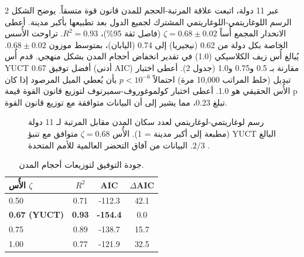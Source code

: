 \documentclass[11pt,a4paper]{article}
\begin{document}
	عبر 11 دولة، اتبعت علاقة المرتبة-الحجم للمدن قانون قوة متسقاً. يوضح الشكل 2 الرسم اللوغاريتمي-اللوغاريتمي المشترك لجميع الدول بعد تطبيعها بأكبر مدينة. أعطى الانحدار المجمع أُساً \(\zeta = 0.68 \pm 0.02\) (فاصل ثقة 95\%)، \(R^2 = 0.93\). تراوحت الأُسس الخاصة بكل دولة من 0.62 (نيجيريا) إلى 0.74 (اليابان)، بمتوسط موزون \(0.68 \pm 0.02\). يُبالغ أُس زيف الكلاسيكي (1.0) في تقدير انخفاض أحجام المدن بشكل منهجي. قدم أُس YUCT 0.67 أفضل توفيق (أدنى AIC) مقارنة بـ 0.5 و0.75 و1.0 (جدول 2). أعطى اختبار تبديل (خلط المراتب 10,000 مرة) احتمالاً \(p < 10^{-6}\) بأن يُعطي الميل المرصود إذا كان الأُس الحقيقي هو 1.0. أعطى اختبار كولموغوروف-سميرنوف لتوزيع قانون القوة قيمة p تبلغ 0.23، مما يشير إلى أن البيانات متوافقة مع توزيع قانون القوة.
	
	\begin{otherlanguage}{english}
		\begin{figure}[htbp]
			\centering
			\caption{رسم لوغاريتمي-لوغاريتمي لعدد سكان المدن مقابل المرتبة لـ 11 دولة (مطبعة إلى أكبر مدينة = 1). الأُس \(\zeta = 0.68\) متوافق مع تنبؤ YUCT البالغ \(2/3\). البيانات من آفاق التحضر العالمية للأمم المتحدة \cite{UN2018}.}
			\label{fig:cities}
		\end{figure}
		
		\begin{table}[htbp]
			\centering
			\caption{جودة التوفيق لتوزيعات أحجام المدن.}
			\label{tab:comparison_cities}
			\begin{tabular}{lccc}
				\toprule
				\textbf{الأُس \(\zeta\)} & \(R^2\) & AIC & \(\Delta\)AIC \\
				\midrule
				0.50 & 0.71 & -112.3 & 42.1 \\
				\textbf{0.67 (YUCT)} & \textbf{0.93} & \textbf{-154.4} & 0.0 \\
				0.75 & 0.89 & -138.7 & 15.7 \\
				1.00 & 0.77 & -121.9 & 32.5 \\
				\bottomrule
			\end{tabular}
		\end{table}
	\end{otherlanguage}
	
\end{document}
